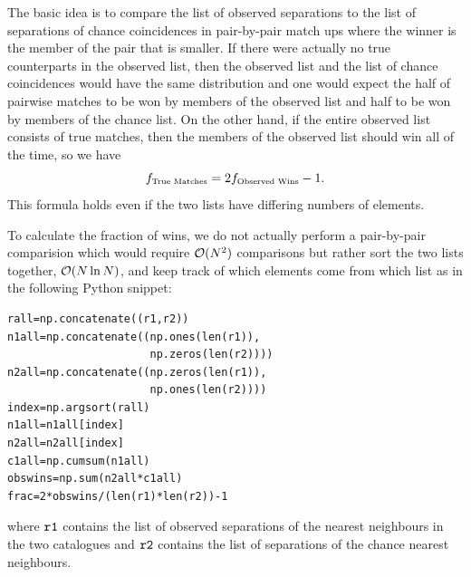 \documentclass[useAMS,usenatbib]{mn2e}
\begin{document}
The basic idea is to compare the list of observed separations to the
list of separations of chance coincidences in pair-by-pair match ups
where the winner is the member of the pair that is smaller.  If there
were actually no true counterparts in the observed list, then the
observed list and the list of chance coincidences would have the same
distribution and one would expect the half of pairwise matches to be
won by members of the observed list and half to be won by members of
the chance list.  On the other hand, if the entire observed list
consists of true matches, then the members of the observed list should
win all of the time, so we have
$$
f_\textrm{\scriptsize True Matches} = 2 f_\textrm{\scriptsize Observed Wins} - 1.
$$
This formula holds even if the two lists have differing numbers of
elements.

To calculate the fraction of wins, we do not actually perform a pair-by-pair
comparision which would require ${\cal O}(N^2)$ comparisons but rather sort the
two lists together, ${\cal O}(N \ln N)$, and keep track of which elements
come from which list as in the following Python snippet:
\begin{verbatim}
rall=np.concatenate((r1,r2))
n1all=np.concatenate((np.ones(len(r1)),
                      np.zeros(len(r2))))
n2all=np.concatenate((np.zeros(len(r1)),
                      np.ones(len(r2))))
index=np.argsort(rall)
n1all=n1all[index]
n2all=n2all[index]
c1all=np.cumsum(n1all)
obswins=np.sum(n2all*c1all)
frac=2*obswins/(len(r1)*len(r2))-1
\end{verbatim}
where ${\tt r1}$ contains the list of observed separations of the
nearest neighbours in the two catalogues and ${\tt r2}$ contains the
list of separations of the chance nearest neighbours.
    
\label{lastpage}
\end{document}
